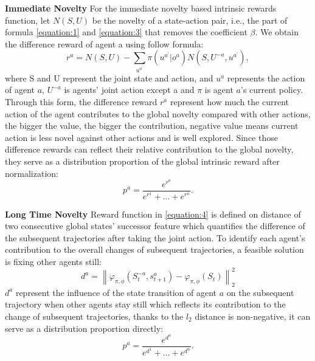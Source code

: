 \documentclass{article} %
\begin{document}
\textbf{Immediate Novelty}
For the immediate novelty based intrinsic rewards function, let $N(S, U)$ be the novelty of a state-action pair, i.e., the part of formula \ref{equation:1} and \ref{equation:3} that removes the coefficient $\beta$. We obtain the difference reward of agent a using follow formula: 
\begin{equation}
\label{equation:6}
    r^{a}=N(S, U)-\sum_{u^{a^{\prime}}} \pi\left(u^{a^{\prime}} | o^{a}\right) N\left(S, U^{-a}, u^{a^{\prime}}\right), 
\end{equation}
where S and U represent the joint state and action, and $u^{a}$ represents the action of agent $a$, $U^{-a}$ is agents' joint action except a and $\pi$ is agent $a$'s current policy. Through this form, the difference reward $r^{a}$ represent how much the current action of the agent contributes to the global novelty compared with other actions, the bigger the value, the bigger the contribution, negative value means current action is less novel against other actions and is well explored. Since those difference rewards can reflect their relative contribution to the global novelty, they serve as a distribution proportion of the global intrinsic reward after normalization:
\begin{equation}
\label{equation:7}
    p^{a}=\frac{e^{r^{a}}}{e^{r^{1}}+\ldots+e^{r^{n}}}.
\end{equation}

\textbf{Long Time Novelty}
Reward function in \ref{equation:4} is defined on distance of two consecutive global states' successor feature which quantifies the difference of the subsequent trajectories after taking the joint action. To identify each agent's contribution to the overall changes of subsequent trajectories, a feasible solution is fixing other agents still:
\begin{equation}
\label{equation:8}
    d^{a}=\left\|\varphi_{\pi, \phi}\left(S_{t}^{-a}, s_{t+1}^{a}\right)-\varphi_{\pi, \phi}\left(S_{t}\right)\right\|_{2}^{2}
\end{equation}
$d^{a}$ represent the influence of the state transition of agent $a$ on the subsequent trajectory when other agents stay still which reflects its contribution to the change of subsequent trajectories, thanks to the $l_{2}$ distance is non-negative, it can serve as a distribution proportion directly:
\begin{equation}
\label{equation:9}
    p^{a}=\frac{e^{d^{a}}}{e^{d^{1}}+\ldots+e^{d^{n}}}.
\end{equation}
\end{document}
